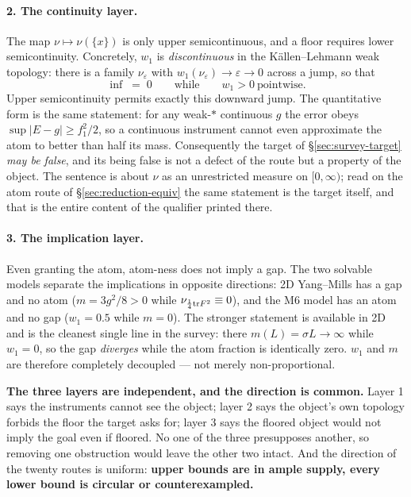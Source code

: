 \paragraph{2. The continuity layer.} The map $\nu\mapsto\nu(\{x\})$ is only upper
semicontinuous, and a floor requires lower semicontinuity. Concretely, $w_1$ is
\emph{discontinuous} in the K\"allen--Lehmann weak topology: there is a family $\nu_\varepsilon$
with $w_1(\nu_\varepsilon)\to\varepsilon\to0$ across a jump, so that
\[
\inf\;=\;0 \qquad\text{while}\qquad w_1>0\ \text{pointwise.}
\]
Upper semicontinuity permits exactly this downward jump. The quantitative form is the same
statement: for any weak-$*$ continuous $g$ the error obeys $\sup|E-g|\ge f_1^2/2$, so a
continuous instrument cannot even approximate the atom to better than half its mass.
Consequently the target of \S\ref{sec:survey-target} \emph{may be false}, and its being
false is not a defect of the route but a property of the object. The sentence is about $\nu$ as an
unrestricted measure on $[0,\infty)$; read on the atom route of \S\ref{sec:reduction-equiv} the
same statement is the target itself, and that is the entire content of the qualifier printed there.

\paragraph{3. The implication layer.} Even granting the atom, atom-ness does not imply a
gap. The two solvable models separate the implications in opposite directions: 2D
Yang--Mills has a gap and no atom ($m=3g^2/8>0$ while $\nu_{\frac14{\rm tr}F^2}\equiv0$),
and the M6 model has an atom and no gap ($w_1=0.5$ while $m=0$). The stronger statement is
available in 2D and is the cleanest single line in the survey: there $m(L)=\sigma L\to\infty$
while $w_1=0$, so the gap \emph{diverges} while the atom fraction is identically zero.
$w_1$ and $m$ are therefore completely decoupled --- not merely non-proportional.

\begin{v3box}
\textbf{The three layers are independent, and the direction is common.} Layer 1 says the
instruments cannot see the object; layer 2 says the object's own topology forbids the
floor the target asks for; layer 3 says the floored object would not imply the goal even
if floored. No one of the three presupposes another, so removing one obstruction would
leave the other two intact. And the direction of the twenty routes is uniform:
\textbf{upper bounds are in ample supply, every lower bound is circular or
counterexampled.}
\end{v3box}

